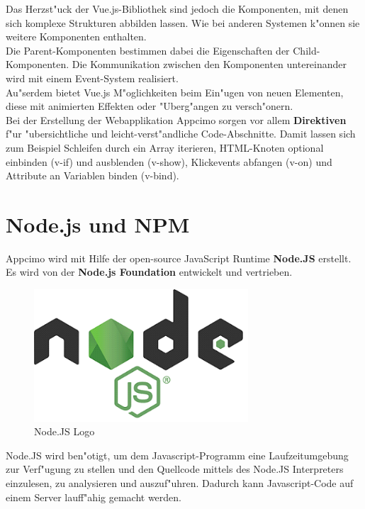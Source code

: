 \documentclass[a4paper, 11pt]{scrreprt}
\begin{document}
Das Herzst"uck der Vue.js-Bibliothek sind jedoch die Komponenten, mit denen sich komplexe Strukturen abbilden lassen. Wie bei anderen Systemen k"onnen sie weitere Komponenten enthalten.\\
Die Parent-Komponenten bestimmen dabei die Eigenschaften der Child-Komponenten. Die Kommunikation zwischen den Komponenten untereinander wird mit einem Event-System realisiert.\\

Au"serdem bietet Vue.js M"oglichkeiten beim Ein"ugen von neuen Elementen, diese mit animierten Effekten oder "Uberg"angen zu versch"onern.\\

Bei der Erstellung der Webapplikation Appcimo sorgen vor allem \textbf{Direktiven} f"ur "ubersichtliche und leicht-verst"andliche Code-Abschnitte. Damit lassen sich zum Beispiel Schleifen durch ein Array iterieren, HTML-Knoten optional einbinden (v-if) und ausblenden (v-show), Klickevents abfangen (v-on) und Attribute an Variablen binden (v-bind).


\section{Node.js und NPM}
Appcimo wird mit Hilfe der open-source JavaScript Runtime \textbf{Node.JS} erstellt. Es wird von der \textbf{Node.js Foundation} entwickelt und vertrieben. \\

\begin{figure} [h]
\begin{center}


\includegraphics[width=8cm]{nodejs.png}
\caption{Node.JS Logo}
\label{nodejs}

\end{center}
\end{figure}

Node.JS wird ben"otigt, um dem Javascript-Programm eine Laufzeitumgebung zur Verf"ugung zu stellen und den Quellcode mittels des Node.JS Interpreters einzulesen, zu analysieren und auszuf"uhren. Dadurch kann Javascript-Code auf einem Server lauff"ahig gemacht werden.\\
\end{document}
